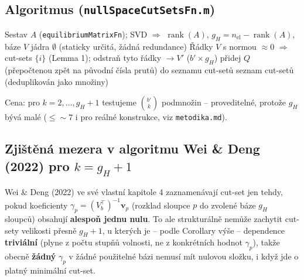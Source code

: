 \documentclass[11pt,a4paper]{article}
\newcommand{\code}[1]{\texttt{#1}}
\newcommand{\rank}{\operatorname{rank}}
\begin{document}
\subsection{Algoritmus (\code{nullSpaceCutSetsFn.m})}

\begin{algorithm}[h]
\caption{Nalezení všech minimálních cut-sets}
\begin{algorithmic}[1]
\State Sestav $A$ (\code{equilibriumMatrixFn}); SVD $\Rightarrow$ $\rank(A)$, $g_H = n_{\mathrm{el}}-\rank(A)$, báze $V$ jádra
 \Return $\emptyset$ (staticky určitá, žádná redundance) \EndIf
\State Řádky $V$ s normou $\approx 0$ $\Rightarrow$ cut-sets $\{i\}$ (Lemma 1); odstraň tyto řádky $\to V'$ ($b'\times g_H$)
        \If{$\rank(V'_Q) < k$} 
             
                \State přidej $Q$ (přepočtenou zpět na původní čísla prutů) do seznamu cut-setů
            \EndIf
        \EndIf
    \EndFor
\EndFor
\State \Return seznam cut-setů (deduplikován jako množiny)
\end{algorithmic}
\end{algorithm}

Cena: pro $k=2,\dots,g_H{+}1$ testujeme $\binom{b'}{k}$ podmnožin -- proveditelné, protože $g_H$ bývá
malé ($\le\!\sim\!7$ i pro reálné konstrukce, viz \code{metodika.md}).

\subsection{Zjištěná mezera v algoritmu Wei \& Deng (2022) pro $k=g_H+1$}

Wei \& Deng (2022) ve své vlastní kapitole 4 zaznamenávají cut-set jen tehdy, pokud koeficienty
$\gamma_p = (V_b^\top)^{-1}\mathbf v_p$ (rozklad sloupce $p$ do zvolené báze $g_H$ sloupců) obsahují
\textbf{alespoň jednu nulu}. To ale strukturálně nemůže zachytit cut-sety velikosti přesně $g_H+1$,
u kterých je -- podle Corollary výše -- dependence \textbf{triviální} (plyne z počtu stupňů volnosti, ne
z konkrétních hodnot $\gamma_p$), takže obecně \textbf{žádný} $\gamma_p$ v žádné použitelné bázi nemusí
mít nulovou složku, i když jde o platný minimální cut-set.
\end{document}
